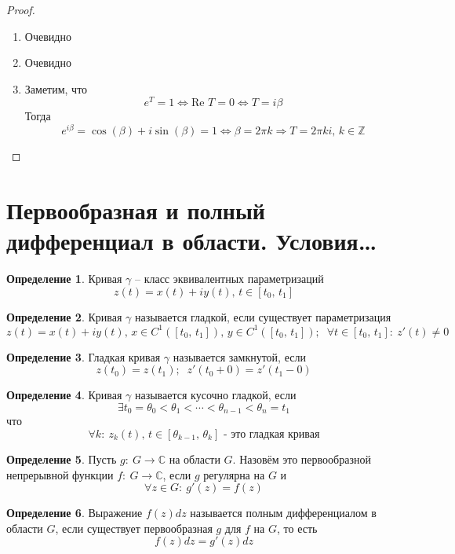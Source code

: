 \documentclass[a4paper,12pt]{article}
\theoremstyle{plain}
\theoremstyle{definition}
\newtheorem{definition}{Определение}[section]
\theoremstyle{remark}
\begin{document}
\begin{proof}
	\begin{enumerate}
		\item Очевидно
		\item Очевидно
		\item Заметим, что
		      \[
			      e^T = 1 \Leftrightarrow \text{Re }T = 0 \Leftrightarrow T = i\beta
		      \]
		      Тогда
		      \[
			      e^{i\beta} = \cos(\beta) + i\sin(\beta) = 1 \Leftrightarrow \beta = 2\pi k \Rightarrow T = 2\pi ki,\, k \in \mathbb{Z}
		      \]
	\end{enumerate}
\end{proof}

\section{Первообразная и полный дифференциал в области. Условия\dots}
\begin{definition}
	Кривая $\gamma$ -- класс эквивалентных параметризаций
	\[
		z(t) = x(t) + iy(t),\, t \in [t_0,\, t_1]
	\]
\end{definition}

\begin{definition}
	Кривая $\gamma$ называется гладкой, если существует параметризация
	\[
		z(t) = x(t) + iy(t),\, x \in C^1([t_0,\,t_1]),\, y \in C^1([t_0,\, t_1]);\;\; \forall t \in [t_0,\, t_1] :\: z'(t) \neq 0
	\]
\end{definition}

\begin{definition}
	Гладкая кривая $\gamma$ называется замкнутой, если
	\[
		z(t_0) = z(t_1);\;\; z'(t_0 + 0) = z'(t_1 - 0)
	\]
\end{definition}

\begin{definition}
	Кривая $\gamma$ называется кусочно гладкой, если
	\[
		\exists t_0 = \theta_0 < \theta_1 < \cdots < \theta_{n - 1} < \theta_n = t_1
	\]
	что
	\[
		\forall k :\: z_k(t),\, t \in [\theta_{k-1},\, \theta_k] \text{ - это гладкая кривая}
	\]
\end{definition}

\begin{definition}
	Пусть $g :\: G \to \mathbb{C}$ на области $G$. Назовём это первообразной непрерывной функции $f :\: G \to \mathbb{C}$, если $g$ регулярна на $G$ и
	\[
		\forall z \in G :\: g'(z) = f(z)
	\]
\end{definition}

\begin{definition}
	Выражение $f(z)dz$ называется полным дифференциалом в области $G$, если существует первообразная $g$ для $f$ на $G$, то есть
	\[
		f(z)dz = g'(z)dz
	\]
\end{definition}
\end{document}
